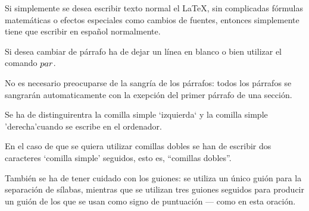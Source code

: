 \documentclass[a4paper,10pt]{letter}
\begin{document}
Si simplemente se desea escribir texto normal el LaTeX,
sin complicadas f\'ormulas matem\'aticas o efectos especiales
como cambios de fuentes, entonces simplemente tiene que escribir
en espa\~nol normalmente.\par
Si desea cambiar de párrafo ha de dejar un línea en blanco o bien
utilizar el comando $\\par$.


No es necesario preocuparse de la sangría de los párrafos:
todos los párrafos se sangrarán automaticamente con la exepción
del primer párrafo de una sección.

Se ha de distinguirentra la comilla simple `izquierda`
y la comilla simple 'derecha'cuando se escribe en el ordenador.

En el caso de que se quiera utilizar comillas dobles se han de
escribir dos caracteres `comilla simple' seguidos, esto es,
``comillas dobles''. 
 
También se ha de tener cuidado con los guiones: se utiliza un único
guión para la separación de sílabas, mientras que se utilizan
tres guiones seguidos para producir un guión de los que se usan
como signo de puntuación --- como en esta oración.
\end{document}
